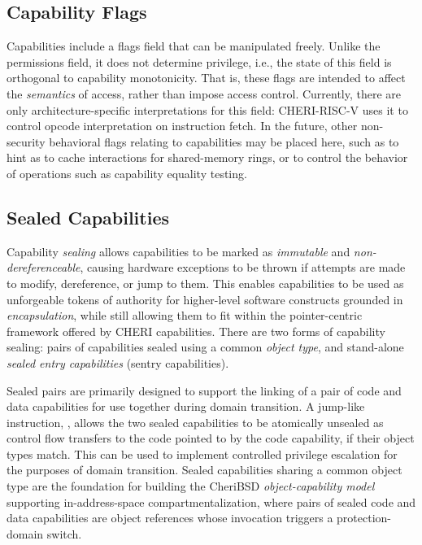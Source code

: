 \subsection{Capability Flags}
\label{sec:model-flags}
Capabilities include a flags field that can be manipulated freely.
Unlike the permissions field, it does not determine privilege, i.e., the state
of this field is orthogonal to capability monotonicity.
%
That is, these flags are intended to affect the \emph{semantics} of access,
rather than impose access control.
%
Currently, there are only architecture-specific interpretations for this
field: CHERI-RISC-V uses it to control opcode interpretation on instruction
fetch.
In the future, other non-security behavioral flags relating to capabilities may
be placed here, such
as to hint as to cache interactions for shared-memory rings, or to control
the behavior of operations such as capability equality testing.

\subsection{Sealed Capabilities}
\label{sec:model-sealedcapabilities}

Capability \textit{sealing} allows capabilities to be marked as
\textit{immutable} and \textit{non-deref\-erenceable}, causing hardware
exceptions to be thrown if attempts are made to modify, dereference, or jump
to them.
This enables capabilities to be used as unforgeable tokens of authority for
higher-level software constructs grounded in \textit{encapsulation}, while
still allowing them to fit within the pointer-centric framework offered by CHERI
capabilities.
There are two forms of capability sealing: pairs of capabilities sealed
using a common \textit{object type}, and stand-alone \textit{sealed entry
capabilities} (sentry capabilities).

Sealed pairs are primarily designed to support the linking of a pair of code
and data capabilities for use together during domain transition.
A jump-like instruction, , allows the two sealed
capabilities to be atomically unsealed as control flow transfers to the code
pointed to by the code capability, if their object types match.
This can be used to implement controlled privilege escalation for the purposes
of domain transition.
Sealed capabilities sharing a common object type are the foundation for
building the CheriBSD \textit{object-capability model} supporting
in-address-space compartmentalization, where pairs of sealed code and data
capabilities are object references whose invocation triggers a
protection-domain switch.

